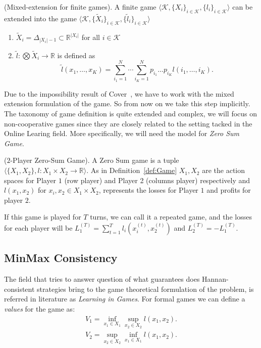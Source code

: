\begin{definition}(Mixed-extension for finite games).
A finite game $\langle\mathcal K,\{X_i\}_{i\in\mathcal K},\{l_i\}_{i\in\mathcal K}\rangle$ can be extended into the game $\langle\mathcal K,\{\tilde X_i\}_{i\in\mathcal K},\{\tilde l_i\}_{i\in\mathcal K}\rangle$
\begin{enumerate}
	\item $\tilde X_i=\Delta_{|X_i|-1}\subset \mathbb R^{|X_i|}$ for all $i\in\mathcal K$ 
	\item $\tilde l:\bigotimes \tilde X_i\to\mathbb R$ is defined as
	$$\tilde l(x_1,\ldots,x_K)=\sum\limits_{i_1=1}^N\cdots\sum\limits_{i_K=1}^Np_{i_1}\ldots p_{i_K}l(i_1,\ldots,i_K).$$ 
\end{enumerate}
\end{definition}

Due to the impossibility result of Cover~\cite{cover1966behavior}, we have to work with the mixed extension formulation of the game. So from now on we take this step implicitly.
The taxonomy of game definition is quite extended and complex, we will focus on non-cooperative games  since they are closely related to the setting tacked in the Online Learing field. More specifically, we will need the model for \emph{Zero Sum Game}. 

\begin{definition}($2$-Player Zero-Sum Game).\label{def:ZSG}
A Zero Sum game is a tuple $\langle\{X_1,X_2\},l:X_1\times X_2\to\mathbb R\rangle$. As in Definition~\ref{def:Game} $X_1,X_2$ are the action spaces for Player $1$ (row player) and Player 2 (columns player) respectively and $l(x_1,x_2)$ for $x_i,x_2\in X_1\times X_2$, represents the losses for Player $1$ and profits for player $2$.
\end{definition}

If this game is played for $T$ turns, we can call it a repeated game, and the losses for each player will be $L_1^{(T)}=\sum\limits_{t=1}^Tl_i\left(x_i^{(t)},x_2^{(t)}\right)$ and $L_2^{(T)}=-L_1^{(T)}$. 


\subsection{MinMax Consistency}
The field that tries to answer question of what guarantees does Hannan-consistent strategies bring to the game theoretical formulation of the problem, is referred in literature as \emph{Learning in Games}.
For formal games we can define a \emph{values} for the game as: 
\begin{align}
    V_1=\inf\limits_{x_1\in X_1}\sup\limits_{x_2\in X_2}l(x_1,x_2).\\
	V_2=\sup\limits_{x_2\in X_2}\inf\limits_{x_1\in X_1}l(x_1,x_2).
\end{align}


